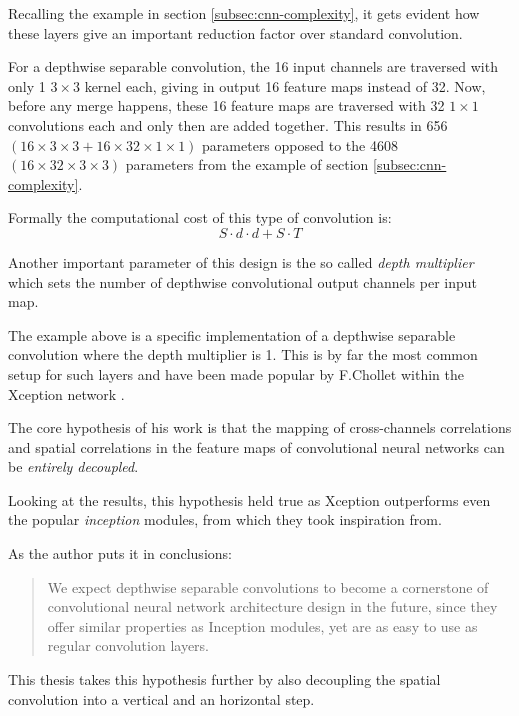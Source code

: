 Recalling the example in section \ref{subsec:cnn-complexity}, it gets evident how these layers give an important reduction factor over standard convolution. 

For a depthwise separable convolution, the 16 input channels are traversed with only 1 $3 \times 3$ kernel each, giving in output 16 feature maps instead of 32. Now, before any merge happens, these 16 feature maps are traversed with 32 $1 \times 1$ convolutions each and only then are added together. This results in 656 $(16\times3\times3 + 16\times32\times1\times1)$ parameters opposed to the 4608 $(16\times32\times3\times3)$ parameters from the example of section \ref{subsec:cnn-complexity}.  

Formally the computational cost of this type of convolution is: 
\begin{equation}
    S\cdot d \cdot d + S \cdot T 
\end{equation}

Another important parameter of this design is the so called \emph{depth multiplier} which sets the number of depthwise convolutional output channels per input map. 

The example above is a specific implementation of a depthwise separable convolution where the depth multiplier is 1. This is by far the most common setup for such layers and have been made popular by F.Chollet within the Xception network \parencite{chollet}. 
\newline 

The core hypothesis of his work is that the mapping of cross-channels correlations and spatial correlations in the feature maps of convolutional neural networks can be \emph{entirely decoupled}. 


Looking at the results, this hypothesis held true as Xception outperforms even the popular \emph{inception} modules, from which they took inspiration from.

As the author puts it in conclusions: 
\begin{quote}
    We expect depthwise separable convolutions to become a cornerstone of convolutional neural network architecture design in the future,  since they offer similar properties as Inception modules, yet are as easy to use as regular convolution layers. 
\end{quote}

This thesis takes this hypothesis further by also decoupling the spatial convolution into a vertical and an horizontal step. 

